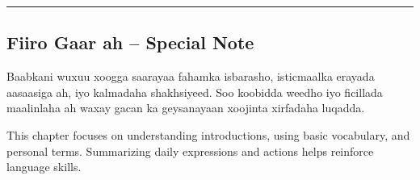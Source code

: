 \documentclass[
  a4paper,
  DIV=11,
  numbers=noendperiod]{scrartcl}
\begin{document}
\begin{center}\rule{0.5\linewidth}{0.5pt}\end{center}

\subsection{Fiiro Gaar ah -- Special
Note}\label{fiiro-gaar-ah-special-note}

Baabkani wuxuu xoogga saarayaa fahamka isbarasho, isticmaalka erayada
aasaasiga ah, iyo kalmadaha shakhsiyeed. Soo koobidda weedho iyo
ficillada maalinlaha ah waxay gacan ka geysanayaan xoojinta xirfadaha
luqadda.

This chapter focuses on understanding introductions, using basic
vocabulary, and personal terms. Summarizing daily expressions and
actions helps reinforce language skills.
\end{document}
